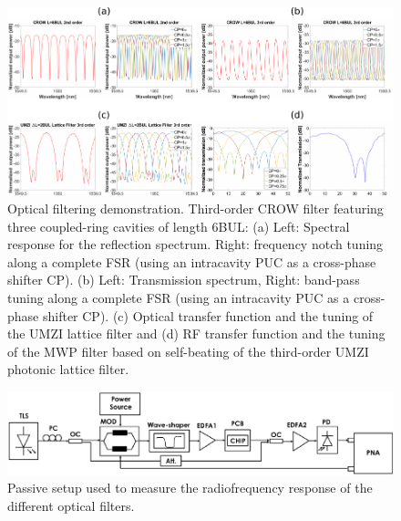 \begin{figure}[t!]
	\begin{center}
		\includegraphics{figures/ch3-filters_osa.pdf}
	\end{center}
	\caption{Optical filtering demonstration.
		Third-order CROW filter featuring three coupled-ring cavities of length 6BUL: (a) Left: Spectral response for the reflection spectrum.
		Right: frequency notch tuning along a complete FSR (using an intracavity PUC as a cross-phase shifter CP).
		(b) Left: Transmission spectrum,  Right: band-pass tuning along a complete FSR (using an intracavity PUC as a cross-phase shifter CP).
		(c) Optical transfer function and the tuning of the UMZI lattice filter and (d) RF transfer function and the tuning of the MWP filter based on self-beating of the third-order UMZI photonic lattice filter. }\label{fig:ch3-filters_osa}
\end{figure}

\begin{figure}[htb]
	\begin{center}
		\includegraphics{figures/ch3-filters_rf_conversion.pdf}
	\end{center}
	\caption{Passive setup used to measure the radiofrequency response of the different optical filters.
	}\label{fig:ch3-filters_rf_conversion}
\end{figure}

